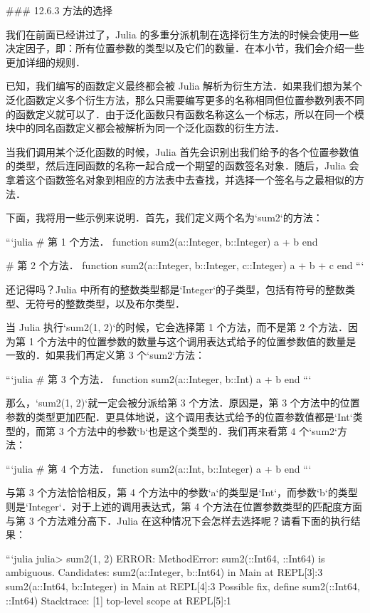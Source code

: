 ### 12.6.3 方法的选择

我们在前面已经讲过了，Julia 的多重分派机制在选择衍生方法的时候会使用一些决定因子，即：所有位置参数的类型以及它们的数量．在本小节，我们会介绍一些更加详细的规则．

已知，我们编写的函数定义最终都会被 Julia 解析为衍生方法．如果我们想为某个泛化函数定义多个衍生方法，那么只需要编写更多的名称相同但位置参数列表不同的函数定义就可以了．由于泛化函数只有函数名称这么一个标志，所以在同一个模块中的同名函数定义都会被解析为同一个泛化函数的衍生方法．

当我们调用某个泛化函数的时候，Julia 首先会识别出我们给予的各个位置参数值的类型，然后连同函数的名称一起合成一个期望的函数签名对象．随后，Julia 会拿着这个函数签名对象到相应的方法表中去查找，并选择一个签名与之最相似的方法．

下面，我将用一些示例来说明．首先，我们定义两个名为`sum2`的方法：

```julia
# 第 1 个方法．
function sum2(a::Integer, b::Integer)
    a + b
end

# 第 2 个方法．
function sum2(a::Integer, b::Integer, c::Integer)
    a + b + c
end
```

还记得吗？Julia 中所有的整数类型都是`Integer`的子类型，包括有符号的整数类型、无符号的整数类型，以及布尔类型．

当 Julia 执行`sum2(1, 2)`的时候，它会选择第 1 个方法，而不是第 2 个方法．因为第 1 个方法中的位置参数的数量与这个调用表达式给予的位置参数值的数量是一致的．如果我们再定义第 3 个`sum2`方法：

```julia
# 第 3 个方法．
function sum2(a::Integer, b::Int)
    a + b
end
```

那么，`sum2(1, 2)`就一定会被分派给第 3 个方法．原因是，第 3 个方法中的位置参数的类型更加匹配．更具体地说，这个调用表达式给予的位置参数值都是`Int`类型的，而第 3 个方法中的参数`b`也是这个类型的．我们再来看第 4 个`sum2`方法：

```julia
# 第 4 个方法．
function sum2(a::Int, b::Integer)
    a + b
end
```

与第 3 个方法恰恰相反，第 4 个方法中的参数`a`的类型是`Int`，而参数`b`的类型则是`Integer`．对于上述的调用表达式，第 4 个方法在位置参数类型的匹配度方面与第 3 个方法难分高下．Julia 在这种情况下会怎样去选择呢？请看下面的执行结果：

```julia
julia> sum2(1, 2)
ERROR: MethodError: sum2(::Int64, ::Int64) is ambiguous. Candidates:
  sum2(a::Integer, b::Int64) in Main at REPL[3]:3
  sum2(a::Int64, b::Integer) in Main at REPL[4]:3
Possible fix, define
  sum2(::Int64, ::Int64)
Stacktrace:
 [1] top-level scope at REPL[5]:1

